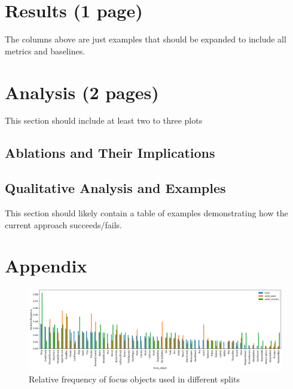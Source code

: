 \documentclass[11pt,a4paper]{article}
\begin{document}
\clearpage

\section{Results (1 page)}
The columns above are just examples that should be expanded to include all metrics and baselines.

\clearpage
\section{Analysis (2 pages)}
This section should include at least two to three plots
\subsection{Ablations and Their Implications}

\subsection{Qualitative Analysis and Examples}
This section should likely contain a table of examples demonstrating how the current approach succeeds/fails.




\clearpage
\section{Appendix}

\begin{figure}
    \centering
    \includegraphics[scale=0.3]{figures/focus_obj_freqs.png}
    \caption{Relative frequency of focus objects used in different splits}
    \label{fig:focus}
\end{figure}
\end{document}
